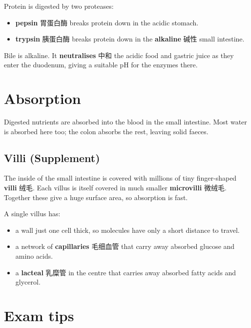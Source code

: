 \documentclass[11pt]{article}
\begin{document}
Protein is digested by two proteases:

\begin{itemize}
\item \textbf{pepsin} 胃蛋白酶 breaks protein down in the acidic stomach.

\item \textbf{trypsin} 胰蛋白酶 breaks protein down in the \textbf{alkaline} 碱性 small intestine.

\end{itemize}

Bile is alkaline. It \textbf{neutralises} 中和 the acidic food and gastric juice as they enter the duodenum, giving a suitable pH for the enzymes there.

\section*{Absorption}

Digested nutrients are absorbed into the blood in the small intestine. Most water is absorbed here too; the colon absorbs the rest, leaving solid faeces.

\subsection*{Villi (Supplement)}

The inside of the small intestine is covered with millions of tiny finger-shaped \textbf{villi} 绒毛. Each villus is itself covered in much smaller \textbf{microvilli} 微绒毛. Together these give a huge surface area, so absorption is fast.

A single villus has:

\begin{itemize}
\item a wall just one cell thick, so molecules have only a short distance to travel.

\item a network of \textbf{capillaries} 毛细血管 that carry away absorbed glucose and amino acids.

\item a \textbf{lacteal} 乳糜管 in the centre that carries away absorbed fatty acids and glycerol.

\end{itemize}

\section*{Exam tips}
\end{document}
